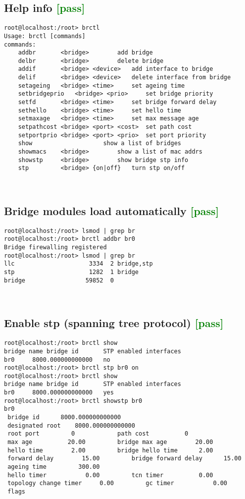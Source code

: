 \documentclass[a4paper]{report}
\begin{document}
\subsection{Help info \textcolor{green}{[pass]}}
\begin{lstlisting}
root@localhost:/root> brctl
Usage: brctl [commands]
commands:
	addbr     	<bridge>		add bridge
	delbr     	<bridge>		delete bridge
	addif     	<bridge> <device>	add interface to bridge
	delif     	<bridge> <device>	delete interface from bridge
	setageing 	<bridge> <time>		set ageing time
	setbridgeprio	<bridge> <prio>		set bridge priority
	setfd     	<bridge> <time>		set bridge forward delay
	sethello  	<bridge> <time>		set hello time
	setmaxage 	<bridge> <time>		set max message age
	setpathcost	<bridge> <port> <cost>	set path cost
	setportprio	<bridge> <port> <prio>	set port priority
	show      				show a list of bridges
	showmacs  	<bridge>		show a list of mac addrs
	showstp   	<bridge>		show bridge stp info
	stp       	<bridge> {on|off}	turn stp on/off
\end{lstlisting}\null\\
\subsection{Bridge modules load automatically \textcolor{green}{[pass]}}
\begin{lstlisting}
root@localhost:/root> lsmod | grep br
root@localhost:/root> brctl addbr br0
Bridge firewalling registered
root@localhost:/root> lsmod | grep br
llc                     3334  2 bridge,stp
stp                     1282  1 bridge
bridge                 59852  0 
\end{lstlisting}\null\\
\subsection{Enable stp (spanning tree protocol) \textcolor{green}{[pass]}}
\begin{lstlisting}
root@localhost:/root> brctl show
bridge name	bridge id		STP enabled	interfaces
br0		8000.000000000000	no		
root@localhost:/root> brctl stp br0 on
root@localhost:/root> brctl show
bridge name	bridge id		STP enabled	interfaces
br0		8000.000000000000	yes	
root@localhost:/root> brctl showstp br0
br0
 bridge id		8000.000000000000
 designated root	8000.000000000000
 root port		   0			path cost		   0
 max age		  20.00			bridge max age		  20.00
 hello time		   2.00			bridge hello time	   2.00
 forward delay		  15.00			bridge forward delay	  15.00
 ageing time		 300.00
 hello timer		   0.00			tcn timer		   0.00
 topology change timer	   0.00			gc timer		   0.00
 flags	
\end{lstlisting}\null\\
\end{document}
